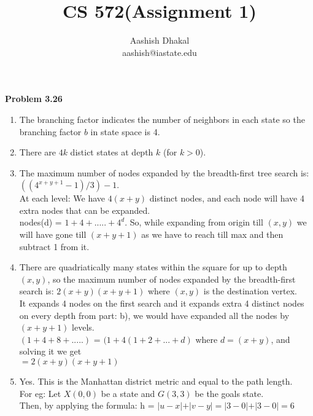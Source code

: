 \documentclass[11pt]{article}
\begin{document}
\title{CS 572(Assignment 1)} %
\author{Aashish Dhakal\\ %
aashish@iastate.edu\\%
 }      %
\date{}


\maketitle
\section*{}

\textbf{Problem 3.26}
\begin{enumerate}[label=(\alph*)]
  \item The branching factor indicates the number of neighbors in each state so the branching factor $b$ in state space is 4.
  \item There are $4k$ distict states at depth $k$ (for $k>0$).
  \item The maximum number of nodes expanded by the breadth-first tree search is: $((4^{x+y+1}-1)/3)-1$.\\
  At each level: We have $4(x+y)$ distinct nodes, and each node will have 4 extra nodes that can be expanded. \\
  nodes(d) = $1 + 4 + .....+ 4^d$. So, while expanding from origin till $(x,y)$ we will have gone till $(x+y+1)$ as we have to reach till max
  and then subtract 1 from it.
  \item There are quadriatically many states within the square for up to depth $(x,y)$, so the maximum number of nodes expanded by the breadth-first
   search is: $2(x+y)(x+y+1)$ where $(x,y)$ is the destination vertex. \\
   It expands 4 nodes on the first search and it expands extra 4 distinct nodes on every depth from part: b), we would have expanded all the
   nodes by $(x+y+1)$ levels.\\
   $(1+4+8+.....)$ = $(1+4(1+2+...+d)$ where $d = (x+y)$, and solving it we get\\
   $= 2(x+y)(x+y+1)$
  \item Yes. This is the Manhattan district metric and equal to the path length.\\
  For eg: Let $X(0, 0)$ be a state and $G(3, 3)$ be the goals state.\\
  Then, by applying the formula: h = $\left|u-x\left| + \left|v-y\left| = \left|3-0\left| + \left|3-0\left| = 6 $

\end{enumerate}
\end{document}
